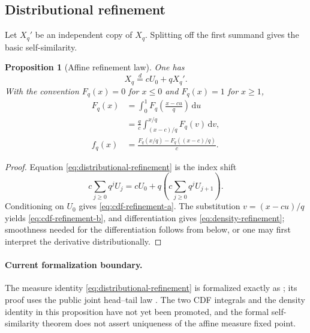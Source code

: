 \documentclass[11pt,oneside]{article}
\newtheorem{proposition}[theorem]{Proposition}
\theoremstyle{definition}
\theoremstyle{remark}
\newcommand{\dd}{\,\mathrm d}
\begin{document}
\subsection{Distributional refinement}

Let $X_q'$ be an independent copy of $X_q$.  Splitting off the first summand gives the basic
self-similarity.

\begin{proposition}[Affine refinement law]
\label{prop:refinement}
One has
\begin{equation}
 X_q\overset d=cU_0+qX_q'.                  \label{eq:distributional-refinement}
\end{equation}
With the convention $F_q(x)=0$ for $x\le0$ and $F_q(x)=1$ for $x\ge1$,
\begin{align}
 F_q(x)
 &=\int_0^1 F_q\!\left(\frac{x-cu}{q}\right)\dd u            \label{eq:cdf-refinement-a}\\
 &=\frac{q}{c}\int_{(x-c)/q}^{x/q}F_q(v)\dd v,               \label{eq:cdf-refinement-b}\\
 f_q(x)
 &=\frac{F_q(x/q)-F_q((x-c)/q)}{c}.                            \label{eq:density-refinement}
\end{align}
\end{proposition}

\begin{proof}
Equation \eqref{eq:distributional-refinement} is the index shift
\[
 c\sum_{j\ge0}q^jU_j=cU_0+q\left(c\sum_{j\ge0}q^jU_{j+1}\right).
\]
Conditioning on $U_0$ gives \eqref{eq:cdf-refinement-a}.  The substitution
$v=(x-cu)/q$ yields \eqref{eq:cdf-refinement-b}, and differentiation gives
\eqref{eq:density-refinement}; smoothness needed for the differentiation follows from
 below, or one may first interpret the derivative distributionally.
\end{proof}

\paragraph{Current formalization boundary.}
The measure identity \eqref{eq:distributional-refinement} is formalized exactly as
; its proof uses the public joint head--tail
law .  The two CDF integrals and
the density identity in this proposition have not yet been promoted, and the formal
self-similarity theorem does not assert uniqueness of the affine measure fixed point.
\end{document}
